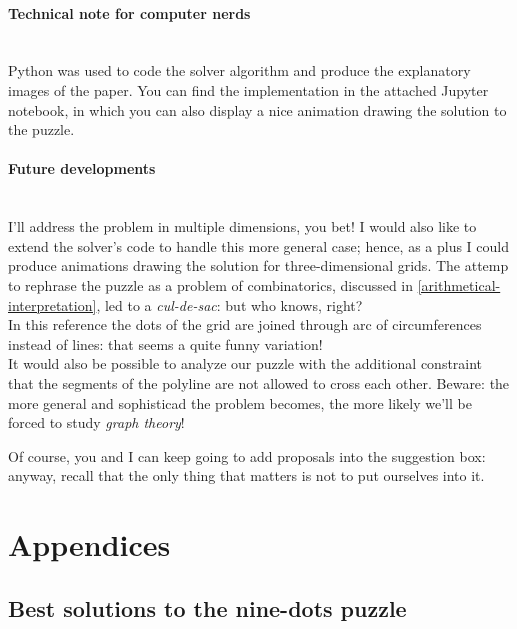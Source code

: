 \documentclass[11pt]{article}
\begin{document}
\paragraph{Technical note for computer nerds} \mbox{} \\
Python was used to code the solver algorithm and produce the explanatory images of the paper. You can find the implementation in the attached Jupyter notebook, in which you can also display a nice animation drawing the solution to the puzzle.

\paragraph{Future developments} \mbox{} \\
I'll address the problem in multiple dimensions, you bet! I would also like to extend the solver's code to handle this more general case; hence, as a plus I could produce animations drawing the solution for three-dimensional grids. The attemp to rephrase the puzzle as a problem of combinatorics, discussed in \autoref{arithmetical-interpretation}, led to a \emph{cul-de-sac}: but who knows, right?\\
In this reference\cite{math-puzzles-site} the dots of the grid are joined through arc of circumferences instead of lines: that seems a quite funny variation!\\
It would also be possible to analyze our puzzle with the additional constraint that the segments of the polyline are not allowed to cross each other. Beware: the more general and sophisticad the problem becomes, the more likely we'll be forced to study \emph{graph theory}!

Of course, you and I can keep going to add proposals into the suggestion box: anyway, recall that the only thing that matters is not to put ourselves into it.

\hypertarget{appendices}{
	\section{Appendices}
	\label{appendices}
}

\hypertarget{best-solutions-nine-dots-puzzle} {
	\subsection{Best solutions to the nine-dots puzzle}
	\label{best-solutions-nine-dots-puzzle}
}

\vspace{1cm}
\end{document}
